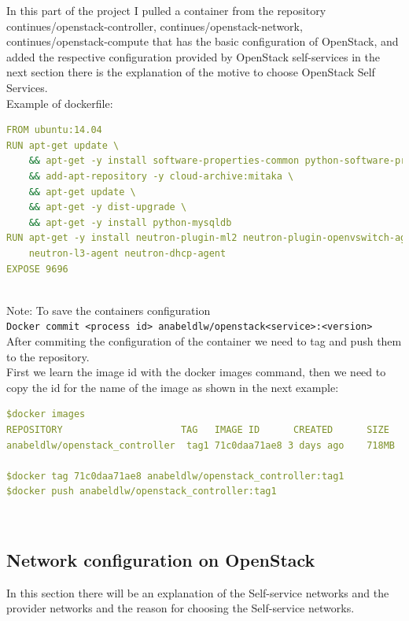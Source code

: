 In this part of the project I pulled a container from the repository continues/openstack-controller, continues/openstack-network, continues/openstack-compute that has the basic configuration of OpenStack, and added the respective configuration provided by OpenStack self-services in the next section there is the explanation of the motive to choose OpenStack Self Services.\\

Example of dockerfile:\\
\begin{lstlisting}[language=yaml,frame=tb,caption={Dockerfile}]
FROM ubuntu:14.04
RUN apt-get update \
	&& apt-get -y install software-properties-common python-software-properties \
	&& add-apt-repository -y cloud-archive:mitaka \
	&& apt-get update \
	&& apt-get -y dist-upgrade \
	&& apt-get -y install python-mysqldb 
RUN apt-get -y install neutron-plugin-ml2 neutron-plugin-openvswitch-agent \
    neutron-l3-agent neutron-dhcp-agent
EXPOSE 9696
\end{lstlisting}\\

Note: To save the containers configuration\\
\texttt{Docker commit <process id> anabeldlw/openstack<service>:<version>}\\

After commiting the configuration of the container we need to tag and push them to the repository.\\

First we learn the image id with the docker images command, then we need to copy the id for the name of the image as shown in the next example:\\
\begin{lstlisting}[language=yaml,frame=tb,caption={Dockerfile}]
$docker images
REPOSITORY				       TAG	 IMAGE ID	   CREATED 	    SIZE
anabeldlw/openstack_controller	tag1 71c0daa71ae8 3 days ago 	718MB

$docker tag 71c0daa71ae8 anabeldlw/openstack_controller:tag1
$docker push anabeldlw/openstack_controller:tag1
\end{lstlisting}\\

\subsection{Network configuration on OpenStack}

In this section there will be an explanation of the Self-service networks and the provider networks and the reason for choosing the Self-service networks.\\

